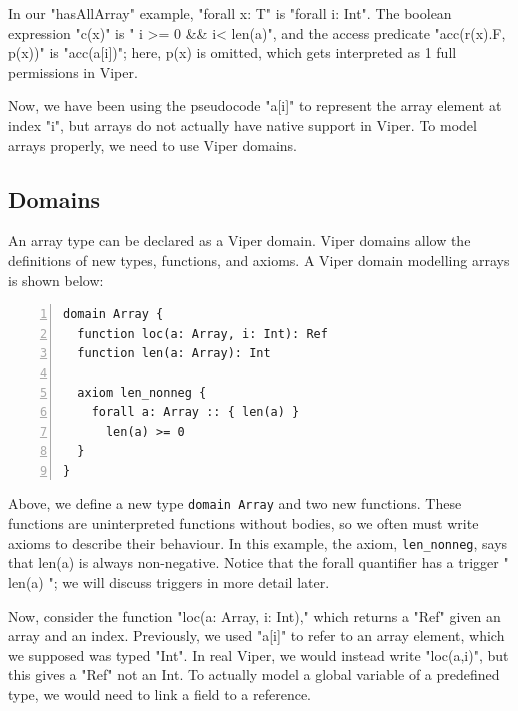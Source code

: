 \documentclass[msc,oneside]{ubcthesis}
\begin{document}
In our "hasAllArray" example, "forall x: T" is  "forall i: Int". The boolean expression "c(x)" is " i >= 0 && i< len(a)", and the access predicate "acc(r(x).F, p(x))" is "acc(a[i])"; here, p(x) is omitted, which gets interpreted as 1 full permissions in Viper.

Now, we have been using the pseudocode "a[i]" to represent the array element at index "i", but arrays do not actually have native support in Viper. To model arrays properly, we need to use Viper domains.



\subsection{Domains}
An array type can be declared as a Viper domain. Viper domains allow the definitions of new types, functions, and axioms. A Viper domain modelling arrays is shown below:

\begin{lstlisting}[language=silver,numbers=left, firstnumber=1, stepnumber=1]
domain Array {
  function loc(a: Array, i: Int): Ref
  function len(a: Array): Int

  axiom len_nonneg {
    forall a: Array :: { len(a) }
      len(a) >= 0
  }
}
\end{lstlisting}

Above, we define a new type \lstinline|domain Array| and two new functions. These functions are uninterpreted functions without bodies, so we often must write axioms to describe their behaviour. In this example, the axiom, \lstinline|len_nonneg|, says that len(a) is always non-negative. Notice that the forall quantifier has a trigger "{ len(a) }"; we will discuss triggers in more detail later.

Now, consider the function "loc(a: Array, i: Int)," which returns a "Ref" given an array and an index. Previously, we used "a[i]" to refer to an array element, which we supposed was typed "Int". In real Viper, we would instead write "loc(a,i)", but this gives a "Ref" not an Int. To actually model a global variable of a predefined type, we would need to link a field to a reference.
\end{document}
